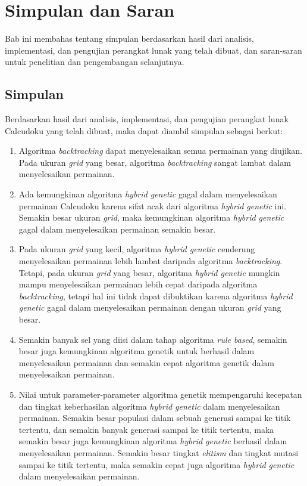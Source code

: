 \chapter{Simpulan dan Saran}
\label{chap:simpulansaran}

Bab ini membahas tentang simpulan berdasarkan hasil dari analisis, implementasi, dan pengujian perangkat lunak yang telah dibuat, dan saran-saran untuk penelitian dan pengembangan selanjutnya.

\section{Simpulan}
\label{sec:simpulan}

Berdasarkan hasil dari analisis, implementasi, dan pengujian perangkat lunak Calcudoku yang telah dibuat, maka dapat diambil simpulan sebagai berkut:

\begin{enumerate}
\item Algoritma \textit{backtracking} dapat menyelesaikan semua permainan yang diujikan. Pada ukuran \textit{grid} yang besar, algoritma \textit{backtracking} sangat lambat dalam menyelesaikan permainan.
\item Ada kemungkinan algoritma \textit{hybrid genetic} gagal dalam menyelesaikan permainan Calcudoku karena sifat acak dari algoritma \textit{hybrid genetic} ini. Semakin besar ukuran \textit{grid}, maka kemungkinan algoritma \textit{hybrid genetic} gagal dalam menyelesaikan permainan semakin besar.
\item Pada ukuran \textit{grid} yang kecil, algoritma \textit{hybrid genetic} cenderung menyelesaikan permainan lebih lambat daripada algoritma \textit{backtracking}. Tetapi, pada ukuran \textit{grid} yang besar, algoritma \textit{hybrid genetic} mungkin mampu menyelesaikan permainan lebih cepat daripada algoritma \textit{backtracking}, tetapi hal ini tidak dapat dibuktikan karena algoritma \textit{hybrid genetic} gagal dalam menyelesaikan permainan dengan ukuran \textit{grid} yang besar.
\item Semakin banyak sel yang diisi dalam tahap algoritma \textit{rule based}, semakin besar juga kemungkinan algoritma genetik untuk berhasil dalam menyelesaikan permainan dan semakin cepat algoritma genetik dalam menyelesaikan permainan.
\item Nilai untuk parameter-parameter algoritma genetik mempengaruhi kecepatan dan tingkat keberhasilan algoritma \textit{hybrid genetic} dalam menyelesaikan permainan. Semakin besar populasi dalam sebuah generasi sampai ke titik tertentu, dan semakin banyak generasi sampai ke titik tertentu, maka semakin besar juga kemungkinan algoritma \textit{hybrid genetic} berhasil dalam menyelesaikan permainan. Semakin besar tingkat \textit{elitism} dan tingkat mutasi sampai ke titik tertentu, maka semakin cepat juga algoritma \textit{hybrid genetic} dalam menyelesaikan permainan.
\end{enumerate}

